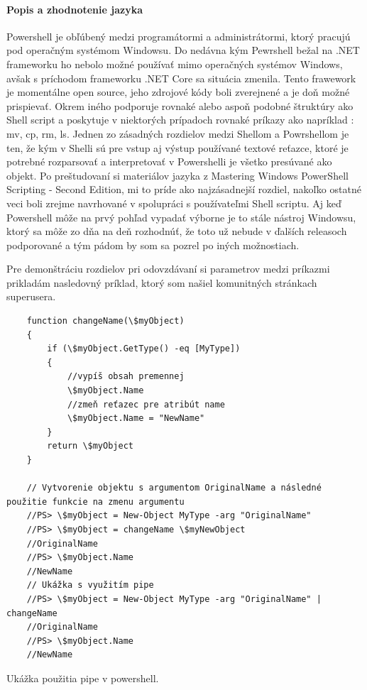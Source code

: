 \paragraph{Popis a zhodnotenie jazyka}
Powershell je obľúbený medzi programátormi a administrátormi, ktorý pracujú pod operačným systémom Windowsu. Do nedávna kým Pewrshell bežal na .NET frameworku ho nebolo možné používať mimo operačných systémov Windows, avšak s príchodom frameworku .NET Core sa situácia zmenila. Tento frawework je momentálne open source, jeho zdrojové kódy boli zverejnené a je doň možné prispievať. Okrem iného podporuje rovnaké alebo aspoň podobné štruktúry ako Shell script a poskytuje v niektorých prípadoch rovnaké príkazy ako napríklad : mv, cp, rm, ls. Jednen zo zásadných rozdielov medzi Shellom a Powrshellom je ten, že kým v Shelli sú pre vstup aj výstup používané textové reťazce, ktoré je potrebné rozparsovať a interpretovať v Powershelli je všetko presúvané ako objekt. Po preštudovaní si materiálov jazyka z Mastering Windows PowerShell Scripting - Second Edition, mi to príde ako najzásadnejší rozdiel, nakoľko ostatné veci boli zrejme navrhované v spolupráci s používateľmi Shell scriptu.
Aj keď Powershell môže na prvý pohľad vypadať výborne je to stále nástroj Windowsu, ktorý sa môže zo dňa na deň rozhodnúť, že toto už nebude v ďalších releasoch podporované a tým pádom by som sa pozrel po iných možnostiach.

Pre demonštráciu rozdielov pri odovzdávaní si parametrov medzi príkazmi prikladám nasledovný príklad, ktorý som našiel komunitných stránkach superusera.

\begin{algorithm}
	\begin{verbatim}
	function changeName(\$myObject)
	{
		if (\$myObject.GetType() -eq [MyType])
		{
			//vypíš obsah premennej
			\$myObject.Name
			//zmeň reťazec pre atribút name
			\$myObject.Name = "NewName"
		}
		return \$myObject
	}
	
	// Vytvorenie objektu s argumentom OriginalName a následné použitie funkcie na zmenu argumentu
	//PS> \$myObject = New-Object MyType -arg "OriginalName"
	//PS> \$myObject = changeName \$myNewObject
	//OriginalName
	//PS> \$myObject.Name
	//NewName
	// Ukážka s využitím pipe
	//PS> \$myObject = New-Object MyType -arg "OriginalName" | changeName
	//OriginalName
	//PS> \$myObject.Name
	//NewName
	\end{verbatim}
	\caption{Ukážka použitia pipe v powershell.}
	\label{alg:gen}
\end{algorithm}

